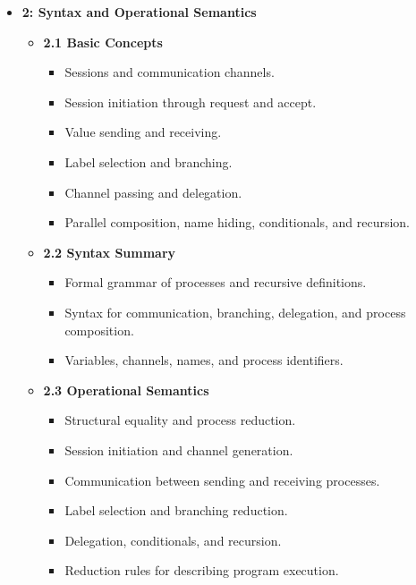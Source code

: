 \begin{itemize}
    \item \textbf{2: Syntax and Operational Semantics}
    \begin{itemize}
        \item \textbf{2.1 Basic Concepts}
        \begin{itemize}
            \item Sessions and communication channels.
            \item Session initiation through request and accept.
            \item Value sending and receiving.
            \item Label selection and branching.
            \item Channel passing and delegation.
            \item Parallel composition, name hiding, conditionals, and recursion.
        \end{itemize}

        \item \textbf{2.2 Syntax Summary}
        \begin{itemize}
            \item Formal grammar of processes and recursive definitions.
            \item Syntax for communication, branching, delegation, and process composition.
            \item Variables, channels, names, and process identifiers.
        \end{itemize}

        \item \textbf{2.3 Operational Semantics}
        \begin{itemize}
            \item Structural equality and process reduction.
            \item Session initiation and channel generation.
            \item Communication between sending and receiving processes.
            \item Label selection and branching reduction.
            \item Delegation, conditionals, and recursion.
            \item Reduction rules for describing program execution.
        \end{itemize}
    \end{itemize}


\end{itemize}
